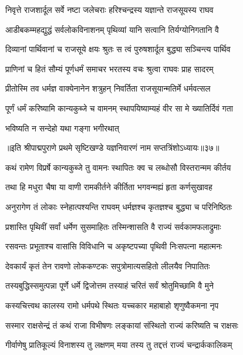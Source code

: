 \twolineshloka
{निवृत्ते राजशार्दूल सर्वे नष्टा जलेचराः}
{हरिश्चन्द्रस्य यज्ञान्ते राजसूयस्य राघव}%

\twolineshloka
{आडीबकम्महद्युद्धं सर्वलोकविनाशनम्}
{पृथिव्यां यानि सत्वानि तिर्यग्योनिगतानि वै}%

\twolineshloka
{दिव्यानां पार्थिवानां च राजसूये क्षयः श्रुतः}
{स त्वं पुरुषशार्दूल बुद्ध्या सञ्चिन्त्य पार्थिव}%

\twolineshloka
{प्राणिनां च हितं सौम्यं पूर्णधर्मं समाचर}
{भरतस्य वचः श्रुत्वा राघवः प्राह सादरम्}%

\twolineshloka
{प्रीतोस्मि तव धर्मज्ञ वाक्येनानेन शत्रुहन्}
{निवर्तिता राजसूयान्मतिर्मे धर्मवत्सल}%

\twolineshloka
{पूर्णं धर्मं करिष्यामि कान्यकुब्जे च वामनम्}
{स्थापयिष्याम्यहं वीर सा मे ख्यातिर्दिवं गता}%

\onelineshloka
{भविष्यति न सन्देहो यथा गङ्गा भगीरथात्}%

{॥इति श्रीपाद्मपुराणे प्रथमे सृष्टिखण्डे यज्ञनिवारणं नाम सप्तत्रिंशोऽध्यायः॥३७॥}



\twolineshloka
{कथं रामेण विप्रर्षे कान्यकुब्जे तु वामनः}
{स्थापितः क्व च लब्धोसौ विस्तरान्मम कीर्तय}%

\twolineshloka
{तथा हि मधुरा चैषा या वाणी रामकीर्तने}
{कीर्तिता भगवन्मह्यं हृता कर्णसुखावह}%

\twolineshloka
{अनुरागेण तं लोकाः स्नेहात्पश्यन्ति राघवम्}
{धर्मज्ञश्च कृतज्ञश्च बुद्ध्या च परिनिष्ठितः}%

\twolineshloka
{प्रशास्ति पृथिवीं सर्वां धर्मेण सुसमाहितः}
{तस्मिन्शासति वै राज्यं सर्वकामफलाद्रुमाः}%

\twolineshloka
{रसवन्तः प्रभूताश्च वासांसि विविधानि च}
{अकृष्टपच्या पृथिवी निःसपत्ना महात्मनः}%

\twolineshloka
{देवकार्यं कृतं तेन रावणो लोककण्टकः}
{सपुत्रोमात्यसहितो लीलयैव निपातितः}%

\twolineshloka
{तस्यबुद्धिस्समुत्पन्ना पूर्णे धर्मे द्विजोत्तम}
{तस्याहं चरितं सर्वं श्रोतुमिच्छामि वै मुने}%


\twolineshloka
{कस्यचित्त्वथ कालस्य रामो धर्मपथे स्थितः}
{यच्चकार महाबाहो शृणुष्वैकमना नृप}%

\twolineshloka
{सस्मार राक्षसेन्द्रं तं कथं राजा विभीषणः}
{लङ्कायां संस्थितो राज्यं करिष्यति च राक्षसः}%

\twolineshloka
{गीर्वाणेषु प्रातिकूल्यं विनाशस्य तु लक्षणम्}
{मया तस्य तु तद्दत्तं राज्यं चन्द्रार्ककालिकम्}%

